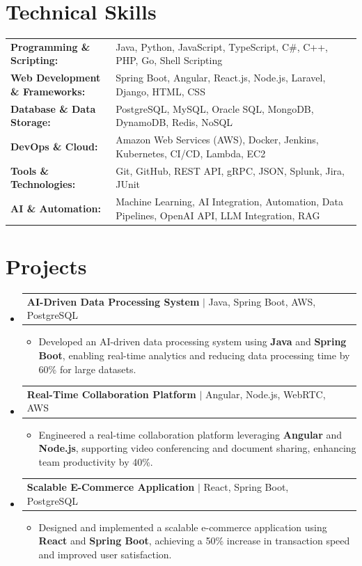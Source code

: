 \documentclass[letterpaper,10pt]{article}
\makeatletter
\newcommand{\resumeItem}[1]{
  \item{\fontsize{8pt}{9pt}\selectfont
    #1 \vspace{-3pt}
  }
}
\newcommand{\resumeProjectHeading}[2]{
    \item
    \begin{tabular*}{1.001\textwidth}{l@{\extracolsep{\fill}}r}
      \fontsize{8.5pt}{10pt}#1 & \textbf{\fontsize{8.5pt}{10pt} #2}\\
    \end{tabular*}\vspace{-7pt}
}
\newcommand{\resumeSubHeadingListStart}{\begin{itemize}[leftmargin=0pt, label={}]}
\newcommand{\resumeSubHeadingListEnd}{\end{itemize}}
\newcommand{\resumeItemListStart}{\begin{itemize}[leftmargin=*]}
\newcommand{\resumeItemListEnd}{\end{itemize}\vspace{-5pt}}
\makeatother
\begin{document}
\section{Technical Skills}
        \vspace{-14pt}
        \begin{table}[h]
            \fontsize{8pt}{9pt}\selectfont
            \begin{tabular}{p{0.3\linewidth} p{0.7\linewidth}}
                \textbf{Programming \& Scripting:} & Java, Python, JavaScript, TypeScript, C\#, C++, PHP, Go, Shell Scripting \\
                \textbf{Web Development \& Frameworks:} & Spring Boot, Angular, React.js, Node.js, Laravel, Django, HTML, CSS \\
                \textbf{Database \& Data Storage:} & PostgreSQL, MySQL, Oracle SQL, MongoDB, DynamoDB, Redis, NoSQL \\
                \textbf{DevOps \& Cloud:} & Amazon Web Services (AWS), Docker, Jenkins, Kubernetes, CI/CD, Lambda, EC2 \\
                \textbf{Tools \& Technologies:} & Git, GitHub, REST API, gRPC, JSON, Splunk, Jira, JUnit \\
                \textbf{AI \& Automation:} & Machine Learning, AI Integration, Automation, Data Pipelines, OpenAI API, LLM Integration, RAG \\
            \end{tabular}
        \end{table}
 \vspace{-18pt}

\section{Projects}
    \vspace{-5pt}
    \resumeSubHeadingListStart
          \resumeProjectHeading
            {\textbf{AI-Driven Data Processing System} $|$ Java, Spring Boot, AWS, PostgreSQL}{}
            \resumeItemListStart
                \resumeItem{Developed an AI-driven data processing system using \textbf{Java} and \textbf{Spring Boot}, enabling real-time analytics and reducing data processing time by 60\% for large datasets.}
            \resumeItemListEnd
        \vspace{-12pt}
    
        \resumeProjectHeading
            {\textbf{Real-Time Collaboration Platform} $|$ Angular, Node.js, WebRTC, AWS}{}
        \resumeItemListStart
                \resumeItem{Engineered a real-time collaboration platform leveraging \textbf{Angular} and \textbf{Node.js}, supporting video conferencing and document sharing, enhancing team productivity by 40\%.}
        \resumeItemListEnd
      \vspace{-12pt}
      \resumeProjectHeading
        {\textbf{Scalable E-Commerce Application} $|$ React, Spring Boot, PostgreSQL}{}
    \resumeItemListStart
            \resumeItem{Designed and implemented a scalable e-commerce application using \textbf{React} and \textbf{Spring Boot}, achieving a 50\% increase in transaction speed and improved user satisfaction.}
    \resumeItemListEnd
    \resumeSubHeadingListEnd
\end{document}
